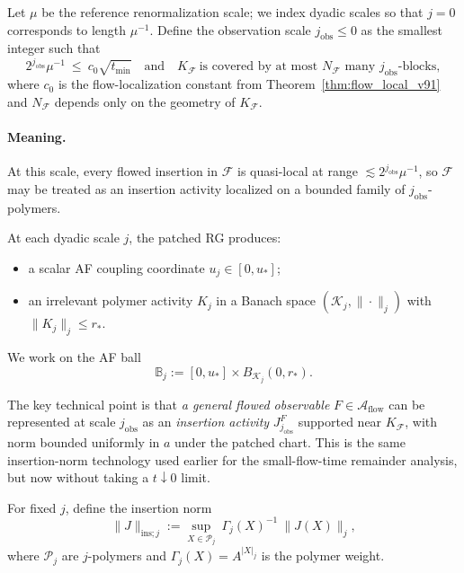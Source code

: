Let $\mu$ be the reference renormalization scale; we index dyadic scales so that $j=0$ corresponds to length $\mu^{-1}$.
Define the observation scale $j_{\mathrm{obs}}\le 0$ as the smallest integer such that
\[
2^{j_{\mathrm{obs}}}\mu^{-1}\ \le\ c_0 \sqrt{t_{\min}}
\quad\text{and}\quad
K_{\mathcal F}\ \text{is covered by at most }N_{\mathcal F}\text{ many }j_{\mathrm{obs}}\text{-blocks},
\]
where $c_0$ is the flow-localization constant from Theorem~\ref{thm:flow_local_v91} and $N_{\mathcal F}$ depends only on the geometry of $K_{\mathcal F}$.

\paragraph{Meaning.}
At this scale, every flowed insertion in $\mathcal F$ is quasi-local at range $\lesssim 2^{j_{\mathrm{obs}}}\mu^{-1}$,
so $\mathcal F$ may be treated as an insertion activity localized on a bounded family of $j_{\mathrm{obs}}$-polymers.

At each dyadic scale $j$, the patched RG produces:
\begin{itemize}
\item a scalar AF coupling coordinate $u_j\in[0,u_\ast]$;
\item an irrelevant polymer activity $K_j$ in a Banach space $(\mathscr K_j,\|\cdot\|_j)$ with $\|K_j\|_j\le r_\ast$.
\end{itemize}
We work on the AF ball
\[
\mathbb B_j := [0,u_\ast]\times B_{\mathscr K_j}(0,r_\ast).
\]

The key technical point is that \emph{a general flowed observable} $F\in\mathcal A_{\mathrm{flow}}$ can be represented at scale $j_{\mathrm{obs}}$
as an \emph{insertion activity} $J^{F}_{j_{\mathrm{obs}}}$ supported near $K_{\mathcal F}$, with norm bounded uniformly in $a$ under the patched chart.
This is the same insertion-norm technology used earlier for the small-flow-time remainder analysis, but now without taking a $t\downarrow 0$ limit.

For fixed $j$, define the insertion norm
\begin{equation}\label{eq:ins_norm_simple}
\|J\|_{\mathrm{ins};j}
:=\sup_{X\in\mathscr P_j}\ \Gamma_j(X)^{-1}\ \|J(X)\|_j,
\end{equation}
where $\mathscr P_j$ are $j$-polymers and $\Gamma_j(X)=A^{|X|_j}$ is the polymer weight.

